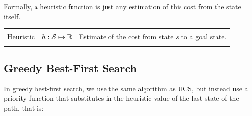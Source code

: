 \documentclass[10pt]{article}
\begin{document}





Formally, a heuristic function is just any estimation of this cost from the state itself. 


\begin{center}
\begin{tabularx}{\linewidth}{llX}
  \toprule \\
 Heuristic & $h: \mathcal{S} \mapsto \mathbb{R}$ & Estimate of the cost from state $s$ to a goal state. \\\\
\bottomrule
\end{tabularx}
\end{center}










\subsection{Greedy Best-First Search}

In greedy best-first search, we use the same algorithm as UCS, but instead use a priority function that substitutes in the heuristic value of the last state of the path, that is: 
\end{document}
